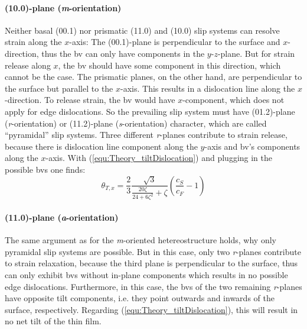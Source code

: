 \paragraph{(10.0)-plane (\textit{m}-orientation)}
Neither basal (00.1) nor prismatic (11.0) and (10.0) slip systems can resolve strain along the $x$-axis:
The (00.1)-plane is perpendicular to the surface and $x$-direction, thus the \gls{bv} can only have components in the $y$-$z$-plane.
But for strain release along $x$, the \gls{bv} should have some component in this direction, which cannot be the case.
The prismatic planes, on the other hand, are perpendicular to the surface but parallel to the $x$-axis.
This results in a dislocation line along the $x$-direction.
To release strain, the \gls{bv} would have $x$-component, which does not apply for edge dislocations.
So the prevailing slip system must have (01.2)-plane (\textit{r}-orientation) or (11.2)-plane (\textit{s}-orientation) character, which are called \enquote{pyramidal} slip systems.
Three different \textit{r}-planes contribute to strain release, because there is dislocation line component along the $y$-axis and \gls{bv}'s components along the $x$-axis. With (\ref{equ:Theory_tiltDislocation}) and plugging in the possible \glspl{bv} one finds:
\begin{equation}
    \theta_{T,x}=\frac{2}{3}\frac{\sqrt{3}}{\frac{20\zeta}{24+6\zeta^2}+\zeta}\left(\frac{c_S}{c_F}-1\right)
\end{equation}

\paragraph{(11.0)-plane (\textit{a}-orientation)}
The same argument as for the \textit{m}-oriented hetereostructure holds, why only pyramidal slip systems are possible.
But in this case, only two \textit{r}-planes contribute to strain relaxation, because the third plane is perpendicular to the surface, thus can only exhibit \glspl{bv} without in-plane components which results in no possible edge dislocations.
Furthermore, in this case, the \glspl{bv} of the two remaining \textit{r}-planes have opposite tilt components, i.e. they point outwards and inwards of the surface, respectively.
Regarding (\ref{equ:Theory_tiltDislocation}), this will result in no net tilt of the thin film.

